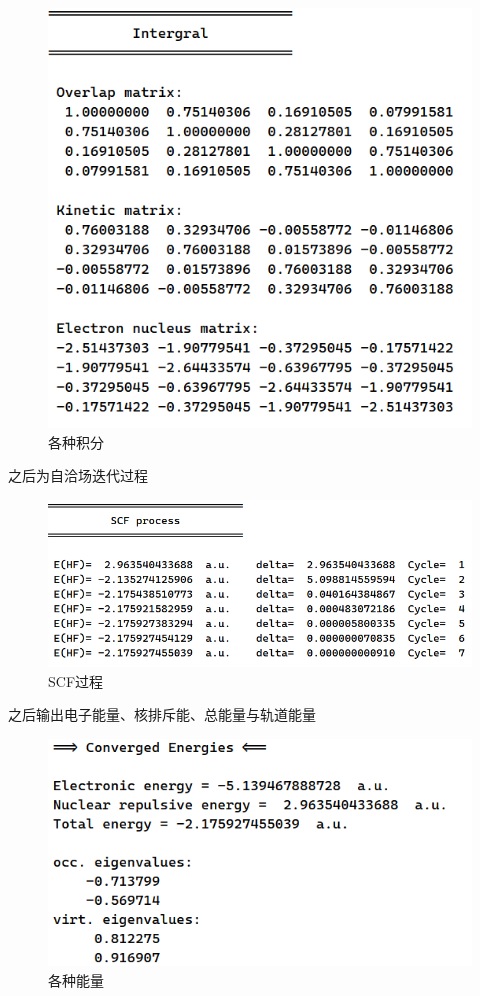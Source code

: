 \documentclass[]{article}
\begin{document}
\begin{figure}[H]
	\centering
	\includegraphics[scale=0.7]{int.png}
	\caption{各种积分}
	\label{Figure 2}
\end{figure}
之后为自洽场迭代过程
\begin{figure}[H]
	\centering
	\includegraphics[scale=0.5]{SCF.png}
	\caption{SCF过程}
	\label{Figure 3}
\end{figure}
之后输出电子能量、核排斥能、总能量与轨道能量
\begin{figure}[H]
	\centering
	\includegraphics[scale=0.6]{E.png}
	\caption{各种能量}
	\label{Figure 4}
\end{figure}
\end{document}

